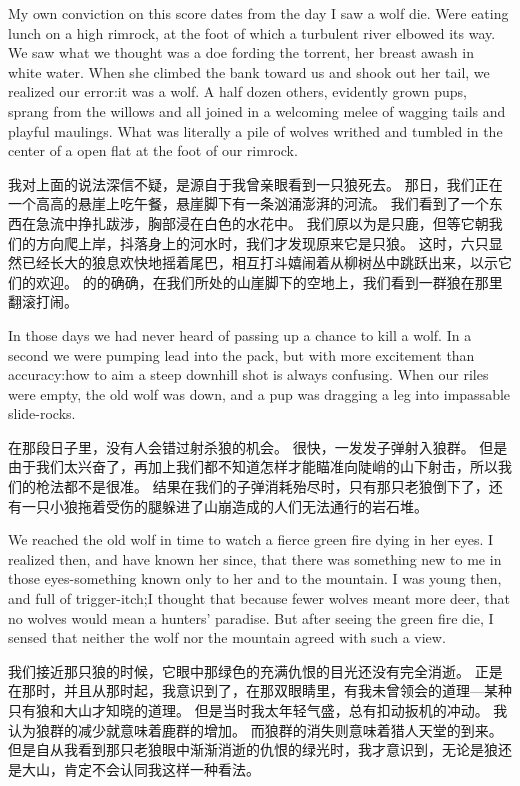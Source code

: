 \documentclass[cs4size, a4paper, 12pt]{article}
\newcounter{numpar}
\newcommand*{\newpar}{\numpar{}}
\begin{document}
	\newpar My own conviction on this score dates from the day I saw a wolf die. Were eating lunch on a high rimrock, at the foot of which a turbulent river elbowed its way. We saw what we thought was a doe fording the torrent, her breast awash in white water. When she climbed the bank toward us and shook out her tail, we realized our error:it was a wolf. A half dozen others, evidently grown pups, sprang from the willows and all joined in a welcoming melee of wagging tails and playful maulings. What was literally a pile of wolves writhed and tumbled in the center of a open flat at the foot of our rimrock.
	
	我对上面的说法深信不疑，是源自于我曾亲眼看到一只狼死去。 那日，我们正在一个高高的悬崖上吃午餐，悬崖脚下有一条汹涌澎湃的河流。 我们看到了一个东西在急流中挣扎跋涉，胸部浸在白色的水花中。 我们原以为是只鹿，但等它朝我们的方向爬上岸，抖落身上的河水时，我们才发现原来它是只狼。 这时，六只显然已经长大的狼息欢快地摇着尾巴，相互打斗嬉闹着从柳树丛中跳跃出来，以示它们的欢迎。 的的确确，在我们所处的山崖脚下的空地上，我们看到一群狼在那里翻滚打闹。 
	
	\newpar In those days we had never heard of passing up a chance to kill a wolf. In a second we were pumping lead into the pack, but with more excitement than accuracy:how to aim a steep downhill shot is always confusing. When our riles were empty, the old wolf was down, and a pup was dragging a leg into impassable slide-rocks.
	
	在那段日子里，没有人会错过射杀狼的机会。 很快，一发发子弹射入狼群。 但是由于我们太兴奋了，再加上我们都不知道怎样才能瞄准向陡峭的山下射击，所以我们的枪法都不是很准。 结果在我们的子弹消耗殆尽时，只有那只老狼倒下了，还有一只小狼拖着受伤的腿躲进了山崩造成的人们无法通行的岩石堆。 
	
	\newpar We reached the old wolf in time to watch a fierce green fire dying in her eyes. I realized then, and have known her since, that there was something new to me in those eyes-something known only to her and to the mountain. I was young then, and full of trigger-itch;I thought that because fewer wolves meant more deer, that no wolves would mean a hunters’ paradise. But after seeing the green fire die, I sensed that neither the wolf nor the mountain agreed with such a view.
	
	我们接近那只狼的时候，它眼中那绿色的充满仇恨的目光还没有完全消逝。 正是在那时，并且从那时起，我意识到了，在那双眼睛里，有我未曾领会的道理—某种只有狼和大山才知晓的道理。 但是当时我太年轻气盛，总有扣动扳机的冲动。 我认为狼群的减少就意味着鹿群的增加。 而狼群的消失则意味着猎人天堂的到来。 但是自从我看到那只老狼眼中渐渐消逝的仇恨的绿光时，我才意识到，无论是狼还是大山，肯定不会认同我这样一种看法。 
	
\end{document}
